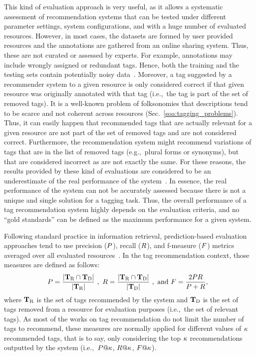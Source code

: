 This kind of evaluation approach is very useful, as it allows a systematic assessment of recommendation systems that can be tested under different parameter settings, system configurations, and with a huge number of evaluated resources.
However, in most cases, the datasets are formed by user provided resources and the annotations are gathered from an online sharing system. Thus, these are not curated or assessed by experts. For example, annotations may include wrongly assigned or redundant tags.
Hence, both the training and the testing sets contain potentially noisy data~\citep{Doerfel2013}.
Moreover, a tag suggested by a recommender system to a given resource is only considered correct if that given resource was originally annotated with that tag (i.e.,~the tag is part of the set of removed tags).
It is a well-known problem of folksonomies that descriptions tend to be scarce and not coherent across resources (Sec.~\ref{soa:tagging_problems}). 
Thus, it can easily happen that recommended tags that are actually relevant for a given resource are not part of the set of removed tags and are not considered correct. Furthermore, the recommendation system might recommend variations of tags that are in the list of removed tags (e.g.,~plural forms or synonyms), but that are considered incorrect as are not exactly the same.
For these reasons, the results provided by these kind of evaluations are considered to be an underestimate of the real performance of the system~\citep{Garg2008}. In essence, the real performance of the system can not be accurately assessed because there is not a unique and single solution for a tagging task. Thus, the overall performance of a tag recommendation system highly depends on the evaluation criteria, and no ``gold standards'' can be defined as the maximum performance for a given system.

Following standard practice in information retrieval, prediction-based evaluation approaches tend to use precision ($P$), recall ($R$), and f-measure ($F$) metrics averaged over all evaluated resources~\citep{Manning2008}. In the tag recommendation context, those measures are defined as follows:
\begin{equation}
  P = \frac{|\mathbf{T}_{\text{R}} \cap \mathbf{T}_{\text{D}}|}{|\mathbf{T}_{\text{R}}|} \text{ }, \text{ }
  R = \frac{|\mathbf{T}_{\text{R}} \cap \mathbf{T}_{\text{D}}|}{|\mathbf{T}_{\text{D}}|} \text{ }, \text{ and }
  F = \frac{2PR}{P + R},
\label{eq:prf_ch2}
\end{equation}
where $\mathbf{T}_{\text{R}}$ is the set of tags recommended by the system and $\mathbf{T}_{\text{D}}$ is the set of tags removed from a resource for evaluation purposes (i.e.,~the set of relevant tags).
As most of the works on tag recommendation do not limit the number of tags to recommend, these measures are normally applied for different values of $\kappa$ recommended tags, that is to say, only considering the top $\kappa$ recommendations outputted by the system (i.e.,~$\precision@\nRecommendedTagsInEvaluation$, $\recall@\nRecommendedTagsInEvaluation$, $\fmeasure@\nRecommendedTagsInEvaluation$). 

